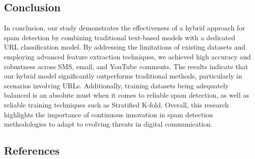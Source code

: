 \documentclass{article}
\begin{document}
\subsection*{Conclusion}
In conclusion, our study demonstrates the effectiveness of a hybrid approach for spam detection by combining traditional text-based models with a dedicated URL classification model. By addressing the limitations of existing datasets and employing advanced feature extraction techniques, we achieved high accuracy and robustness across SMS, email, and YouTube comments. The results indicate that our hybrid model significantly outperforms traditional methods, particularly in scenarios involving URLs. Additionally, training datasets being adequately balanced is an absolute must when it comes to reliable spam detection, as well as reliable training techniques such as Stratified K-fold. Overall, this research highlights the importance of continuous innovation in spam detection methodologies to adapt to evolving threats in digital communication.


\newpage
\subsection*{References}
\end{document}
